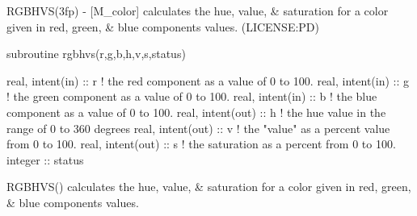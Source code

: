 \begin{DoxyDescription}
\item[\label{_RGBHVS}%
N\+A\+ME ]R\+G\+B\+H\+V\+S(3fp) -\/ \mbox{[}M\+\_\+color\mbox{]} calculates the hue, value, \& saturation for a color given in red, green, \& blue components values. (L\+I\+C\+E\+N\+SE\+:PD) 


\item[S\+Y\+N\+O\+P\+S\+IS ]
\begin{DoxyPre}
    subroutine rgbhvs(r,g,b,h,v,s,status)\end{DoxyPre}



\begin{DoxyPre}     real, intent(in)  :: r ! the red component as a value of 0 to 100.
     real, intent(in)  :: g ! the green component as a value of 0 to 100.
     real, intent(in)  :: b ! the blue component as a value of 0 to 100.
     real, intent(out) :: h ! the hue value in the range of 0 to 360 degrees
     real, intent(out) :: v ! the "value" as a percent value from 0 to 100.
     real, intent(out) :: s ! the saturation as a percent from 0 to 100.
     integer           :: status
    
\begin{DoxyPre}
 \end{DoxyPre}
\end{DoxyPre}



\begin{DoxyPre}
\begin{DoxyPre} \end{DoxyPre}
\end{DoxyPre}

\item[D\+E\+S\+C\+R\+I\+P\+T\+I\+ON ]
\begin{DoxyPre}
\begin{DoxyPre}\end{DoxyPre}
\end{DoxyPre}



\begin{DoxyPre}
\begin{DoxyPre} RGBHVS() calculates the hue, value, \& saturation
 for a color given in red, green, \& blue components values.
 ~\newline
~\newline
\end{DoxyPre}
\end{DoxyPre}




\end{DoxyDescription}
